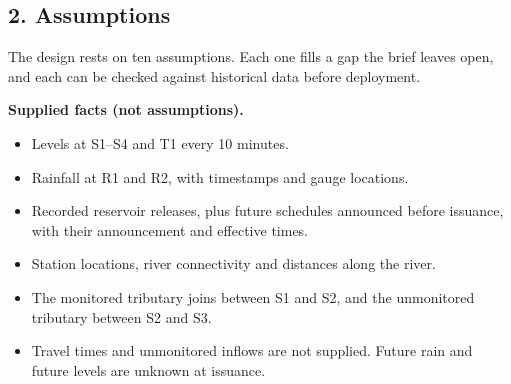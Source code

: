 \documentclass[11pt]{article}
\providecommand{\tightlist}{}
\begin{document}
\subsection*{2. Assumptions}

The design rests on ten assumptions. Each one fills a gap the brief leaves open, and each can be checked against historical data before deployment.

\textbf{Supplied facts (not assumptions).}

\begin{itemize}
\tightlist
\item
  Levels at S1--S4 and T1 every 10 minutes.
\item
  Rainfall at R1 and R2, with timestamps and gauge locations.
\item
  Recorded reservoir releases, plus future schedules announced before issuance, with their announcement and effective times.
\item
  Station locations, river connectivity and distances along the river.
\item
  The monitored tributary joins between S1 and S2, and the unmonitored tributary between S2 and S3.
\item
  Travel times and unmonitored inflows are not supplied. Future rain and future levels are unknown at issuance.
\end{itemize}
\end{document}
